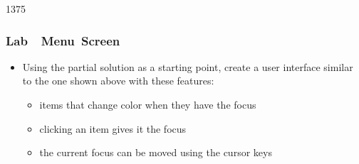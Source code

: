 \begin{slide}{1375}\frametitle{Lab~\textendash~Menu~Screen}


\begin{itemize}
\item Using the partial solution as a starting point, create a user interface
similar to the one shown above with these features:
  \begin{itemize}
  \item items that change color when they have the focus
  \item clicking an item gives it the focus
  \item the current focus can be moved using the cursor keys
  \end{itemize}
\end{itemize}       


\end{slide}                                 
